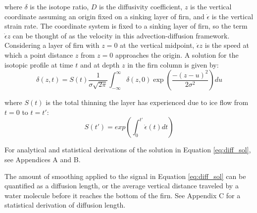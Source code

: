 \documentclass[draft, jgrga]{AGUTeX}
\begin{document}
\begin{article}
where \begin{math} \delta \end{math} is the isotope ratio, \begin{math} D \end{math} is the diffusivity coefficient, \begin{math} z \end{math} is the vertical coordinate assuming an origin fixed on a sinking layer of firn, and \begin{math} \dot{\epsilon} \end{math} is the vertical strain rate. The coordinate system is fixed to a sinking layer of firn, so the term \begin{math} \dot{\epsilon} z \end{math} can be thought of as the velocity in this advection-diffusion framework. Considering a layer of firn with \begin{math} z = 0 \end{math} at the vertical midpoint, \begin{math} \dot{\epsilon} z \end{math} is the speed at which a point distance \begin{math} z \end{math} from \begin{math} z=0 \end{math} approaches the origin. A solution for the isotopic profile at time $t$ and at depth $z$ in the firn column is given by:
\begin{equation}
\label{eq:diff_sol}
\delta (z,t) = S(t) \frac{1}{\sigma \sqrt{2 \pi}}
\int^\infty_{-\infty} \delta (z,0) \exp \left(\frac{-(z-u)^2}{2 \sigma ^2} \right)du
\end{equation}

where \begin{math} S(t) \end{math} is the total thinning the layer has experienced due to ice flow from $t=0$ to $t=t'$:
\begin{equation}
S(t') = exp \left( \int^{t'}_{0} \dot{\epsilon}(t) dt \right)
\end{equation}

For analytical and statistical derivations of the solution in Equation \ref{eq:diff_sol}, see Appendices A and B.

The amount of smoothing applied to the signal in Equation \ref{eq:diff_sol} can be quantified as a diffusion length, or the average vertical distance traveled by a water molecule before it reaches the bottom of the firn. See Appendix C for a statistical derivation of diffusion length.



\end{article}
\end{document}
